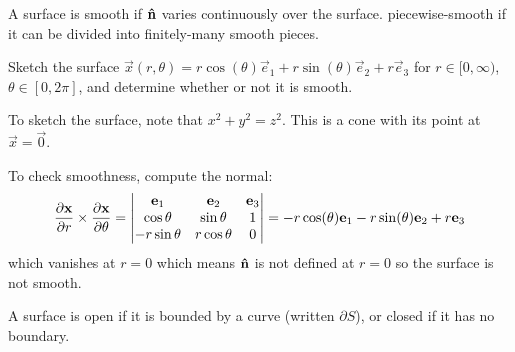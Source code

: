 \documentclass[10pt, a4paper]{article}
\newif\ifplots
\begin{document}
A surface is smooth if $\hvec{n}$ varies continuously over the surface.
piecewise-smooth if it can be divided into finitely-many smooth pieces.

\begin{example}
    Sketch the surface $\vec{x}(r, \theta) = r\cos(\theta)\vec{e}_1 + r\sin(\theta)\vec{e}_2 + r\vec{e}_3$ for $r \in [0, \infty)$,
    $\theta \in [0, 2\pi]$,
    and determine whether or not it is smooth.

    \begin{solution}
        To sketch the surface,
        note that $x ^ 2 + y ^ 2 = z ^ 2$.
        This is a cone with its point at $\vec{x} = \vec{0}$.

        \ifplots
        \begin{figure}[h!]
             \begin{tikzpicture}
                 \begin{axis}
                 [
                 view={130}{30},
                 z buffer=sort,
                 ticks=none,
                 ]
                 \addplot3[surf,shader=interp,
                     domain=0:2*pi,
                     y domain = 0:3,
                     samples=40,
                     samples y=20,
                     colormap/cool,
                     shader=interp,
                 ]
                 ({y*cos(deg(x))},
                 {y*sin(deg(x))},
                 {y});
                 \end{axis}
             \end{tikzpicture}
        \end{figure}
        \fi

        To check smoothness,
        compute the normal:
        \[
        \pd[\vec{x}]{r} \times \pd[\vec{x}]{\theta} = \begin{vmatrix}
            \vec{e}_1 & \vec{e}_2 & \vec{e}_3 \\
            \cos{\theta} & \sin{\theta} & 1 \\
            -r\sin{\theta} & r\cos{\theta} & 0
        \end{vmatrix} = -r\cos(\theta)\vec{e}_1 - r\sin(\theta)\vec{e}_2 + r\vec{e}_3
        \]
        which vanishes at $r = 0$ which means $\hvec{n}$ is not defined at $r = 0$ so the surface is not smooth.
    \end{solution}
\end{example}

A surface is open if it is bounded by a curve
(written $\partial S$),
or closed if it has no boundary.
\end{document}
